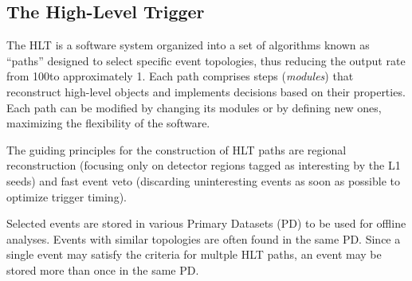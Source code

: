 \subsection{The High-Level Trigger}
\label{sec:hlt}
The HLT is a software system organized into a set of algorithms known as ``paths'' designed to select specific event topologies, thus reducing the output rate from 100\KHz to approximately 1\KHz.
Each path comprises steps (\emph{modules}) that reconstruct high-level objects and implements decisions based on their properties.
Each path can be modified by changing its modules or by defining new ones, maximizing the flexibility of the software.

The guiding principles for the construction of HLT paths are regional reconstruction (focusing only on detector regions tagged as interesting by the L1 seeds) and fast event veto (discarding uninteresting events as soon as possible to optimize trigger timing).

Selected events are stored in various Primary Datasets (PD) to be used for offline analyses.
Events with similar topologies are often found in the same PD.
Since a single event may satisfy the criteria for multple HLT paths, an event may be stored more than once in the same PD.

